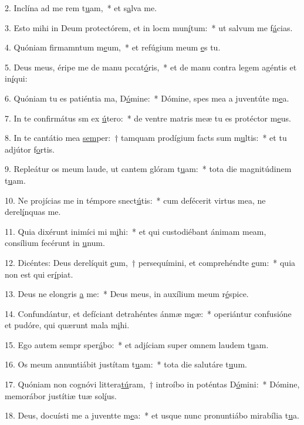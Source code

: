 2. Inclína ad me rem t\uline{u}am,~* et s\uline{a}lva me.\par 
3. Esto mihi in Deum protectórem, et in locm mun\uline{í}tum:~* ut salvum me f\uline{á}cias.\par 
4. Quóniam firmamntum m\uline{e}um,~* et refúgium meum \uline{e}s tu.\par 
5. Deus meus, éripe me de manu pccat\uline{ó}ris,~* et de manu contra legem agéntis et in\uline{í}qui:\par 
6. Quóniam tu es patiéntia ma, D\uline{ó}mine:~* Dómine, spes mea a juventúte m\uline{e}a.\par 
7. In te confirmátus sm ex \uline{ú}tero:~* de ventre matris meæ tu es protéctor m\uline{e}us.\par 
8. In te cantátio mea \uline{sem}per:~† tamquam prodígium facts sum m\uline{u}ltis:~* et tu adjútor f\uline{o}rtis.\par 
9. Repleátur os meum laude, ut cantem glóram t\uline{u}am:~* tota die magnitúdinem t\uline{u}am.\par 
10. Ne projícias me in témpore snect\uline{ú}tis:~* cum defécerit virtus mea, ne derel\uline{í}nquas me.\par 
11. Quia dixérunt inimíci mi m\uline{i}hi:~* et qui custodiébant ánimam meam, consílium fecérunt in \uline{u}num.\par 
12. Dicéntes: Deus derelíquit \uline{e}um,~† persequímini, et comprehéndte \uline{e}um:~* quia non est qui er\uline{í}piat.\par 
13. Deus ne elongris \uline{a} me:~* Deus meus, in auxílium meum r\uline{é}spice.\par 
14. Confundántur, et defíciant detrahéntes ánmæ m\uline{e}æ:~* operiántur confusióne et pudóre, qui quærunt mala m\uline{i}hi.\par 
15. Ego autem sempr sper\uline{á}bo:~* et adjíciam super omnem laudem t\uline{u}am.\par 
16. Os meum annuntiábit justítam t\uline{u}am:~* tota die salutáre t\uline{u}um.\par 
17. Quóniam non cognóvi littera\uline{tú}ram,~† introíbo in poténtas D\uline{ó}mini:~* Dómine, memorábor justítiæ tuæ sol\uline{í}us.\par 
18. Deus, docuísti me a juventte m\uline{e}a:~* et usque nunc pronuntiábo mirabília t\uline{u}a.\par 
